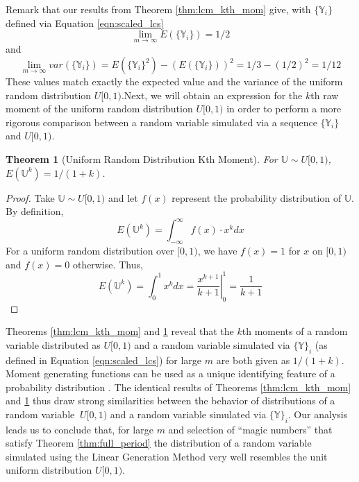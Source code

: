 \documentclass{article}
\theoremstyle{break}
\newtheorem{theorem}{Theorem}[section]
\begin{document}
Remark that our results from Theorem \ref{thm:lcm_kth_mom} give, with $\{\mathbb{Y}_i\}$ defined via Equation \ref{eqn:scaled_lcs}
\[
\lim_{m\rightarrow\infty}E(\{\mathbb{Y}_{i}\}) = 1/2
\]
and 
\[
\lim_{m\rightarrow\infty}var(\{\mathbb{Y}_{i}\}) = E(\{\mathbb{Y}_{i}\}^2) - (E(\{\mathbb{Y}_{i}\}))^2 = 1/3 - (1/2)^2 = 1/12 
\]
These values match exactly the expected value and the variance of the uniform random distribution $U[0,1)$.Next, we will obtain an expression for the $k$th raw moment of the uniform random distribution $U[0,1)$ in order to perform a more rigorous comparison between a random variable simulated via a sequence $\{\mathbb{Y}_{i}\}$ and $U[0,1)$.
\begin{theorem}[Uniform Random Distribution Kth Moment] \label{thm:urd_kth_mom}
For $\mathbb{U} \sim U[0,1)$, $E(\mathbb{U}^k) = 1/(1+k)$.
\end{theorem}
\begin{proof}
Take $\mathbb{U} \sim U[0,1)$ and let $f(x)$ represent the probability distribution of $\mathbb{U}$. By definition,
\[
E(\mathbb{U}^k) = \int_{-\infty}^{\infty} f(x) \cdot x^k dx
\]
For a uniform random distribution over $[0,1)$, we have $f(x) = 1$ for $x$ on $[0,1)$ and $f(x) = 0$ otherwise. Thus,
\[
E(\mathbb{U}^k) = \int_{0}^{1} x^k dx = \left. \frac{x^{k+1}}{k+1} \right|_0^1 = \frac{1}{k+1}
\]
\end{proof}
Theorems \ref{thm:lcm_kth_mom} and \ref{thm:urd_kth_mom} reveal that the $k$th moments of a random variable distributed as $U[0,1)$ and a random variable simulated via $\{\mathbb{Y}\}_i$ (as defined in Equation \ref{eqn:scaled_lcs}) for large $m$ are both given as $1/(1+k)$. Moment generating functions can be used as a unique identifying feature of a probability distribution \autocite{dunbar_stochastic_????}. The identical results of Theorems  \ref{thm:lcm_kth_mom} and \ref{thm:urd_kth_mom} thus draw strong similarities between the behavior of distributions of a random variable $~ U[0,1)$ and a random variable simulated via $\{\mathbb{Y}\}_i$. Our analysis leads us to conclude that, for large $m$ and selection of ``magic numbers'' that satisfy Theorem \ref{thm:full_period} the distribution of a random variable simulated using the Linear Generation Method very well resembles the unit uniform distribution $U[0,1)$.
\end{document}
